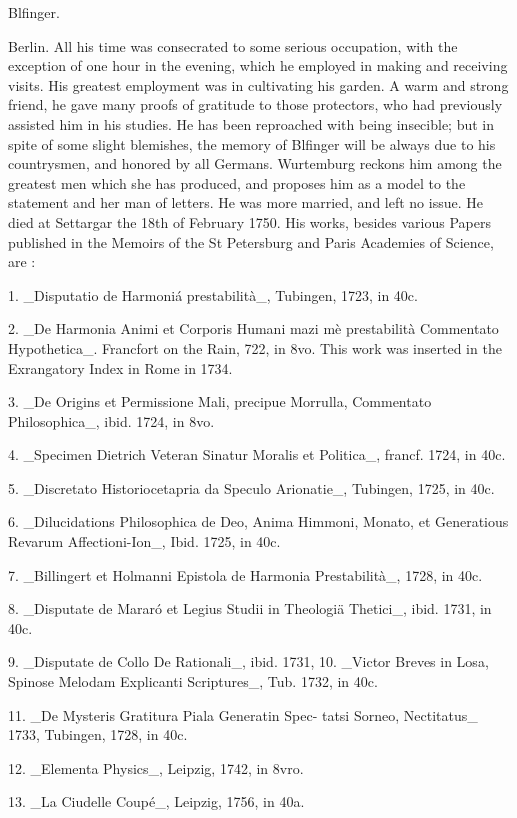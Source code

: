 \documentclass{article}
\begin{document}
Blfinger.

Berlin. All his time was consecrated to some serious occupation, with the exception of one hour in the evening, which he employed in making and receiving visits. His greatest employment was in cultivating his garden. A warm and strong friend, he gave many proofs of gratitude to those protectors, who had previously assisted him in his studies. He has been reproached with being insecible; but in spite of some slight blemishes, the memory of Blfinger will be always due to his countrysmen, and honored by all Germans. Wurtemburg reckons him among the greatest men which she has produced, and proposes him as a model to the statement and her man of letters. He was more married, and left no issue. He died at Settargar the 18th of February 1750. His works, besides various Papers published in the Memoirs of the St Petersburg and Paris Academies of Science, are :

1. \_Disputatio de Harmoniá prestabilità\_, Tubingen, 1723, in 40c.

2. \_De Harmonia Animi et Corporis Humani mazi mè prestabilità Commentato Hypothetica\_. Francfort on the Rain, 722, in 8vo. This work was inserted in the Exrangatory Index in Rome in 1734.

3. \_De Origins et Permissione Mali, precipue Morrulla, Commentato Philosophica\_, ibid. 1724, in 8vo.

4. \_Specimen Dietrich Veteran Sinatur Moralis et Politica\_, francf. 1724, in 40c.

5. \_Discretato Historiocetapria da Speculo Arionatie\_, Tubingen, 1725, in 40c.

6. \_Dilucidations Philosophica de Deo, Anima Himmoni, Monato, et Generatious Revarum Affectioni-Ion\_, Ibid. 1725, in 40c.

7. \_Billingert et Holmanni Epistola de Harmonia Prestabilità\_, 1728, in 40c.

8. \_Disputate de Mararó et Legius Studii in Theologiä Thetici\_, ibid. 1731, in 40c.

9. \_Disputate de Collo De Rationali\_, ibid. 1731, 10. \_Victor Breves in Losa, Spinose Melodam Explicanti Scriptures\_, Tub. 1732, in 40c.

11. \_De Mysteris Gratitura Piala Generatin Spec- tatsi Sorneo, Nectitatus\_ 1733, Tubingen, 1728, in 40c.

12. \_Elementa Physics\_, Leipzig, 1742, in 8vro.

13. \_La Ciudelle Coupé\_, Leipzig, 1756, in 40a.
\end{document}
